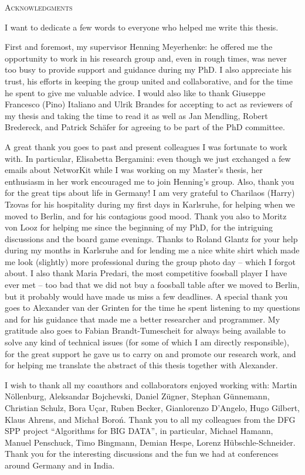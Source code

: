 \pagestyle{plain}
\begin{center}
  \textsc{Acknowledgments}
\end{center}
%
\noindent
%
I want to dedicate a few words to everyone who helped me write this thesis.

First and foremost, my supervisor Henning Meyerhenke: he offered me the
opportunity to work in his research group and, even in rough times, was never
too busy to provide support and guidance during my PhD. I also appreciate his
trust, his efforts in keeping the group united and collaborative, and for the
time he spent to give me valuable advice.
I would also like to thank Giuseppe Francesco (Pino) Italiano and
Ulrik Brandes for accepting to act as reviewers of my thesis and taking the time
to read it as well as Jan Mendling, Robert Bredereck, and Patrick Schäfer for
agreeing to be part of the PhD committee.

A great thank you goes to past and present colleagues I was fortunate to
work with. In particular, Elisabetta Bergamini: even though we just exchanged
a few emails about NetworKit while I was working on my Master's thesis,
her enthusiasm in her work encouraged me to join Henning's group.
Also, thank you for the great tips about life in Germany!
I am very grateful to Charilaos (Harry) Tzovas for his hospitality during
my first days in Karlsruhe, for helping when we moved to Berlin, and for
his contagious good mood.
Thank you also to Moritz von Looz for helping me since the beginning of my PhD,
for the intriguing discussions and the board game evenings.
Thanks to Roland Glantz for your help during my months in Karlsruhe and for
lending me a nice white shirt which made me look (slightly) more professional
during the group photo day -- which I forgot about.
I also thank Maria Predari, the most competitive foosball player I have ever met
-- too bad that we did not buy a foosball table after we moved to Berlin, but
it probably would have made us miss a few deadlines.
A special thank you goes to Alexander van der Grinten for the time he spent listening
to my questions and for his guidance that made me a better researcher and programmer.
My gratitude also goes to Fabian Brandt-Tumescheit for always being available to
solve any kind of technical issues (for some of which I am directly responsible),
for the great support he gave us to carry on and promote our research work, and for
helping me translate the abstract of this thesis together with Alexander.

I wish to thank all my coauthors and collaborators enjoyed working with: Martin
N\"ollenburg, Aleksandar Bojchevski, Daniel Z\"ugner, Stephan G\"unnemann,
Christian Schulz, Bora Uçar, Ruben Becker, Gianlorenzo D'Angelo, Hugo Gilbert,
Klaus Ahrens, and Micha{\l} Boro{\'n}.
Thank you to all my colleagues from the DFG SPP project \enquote{Algorithms for
BIG DATA}, in particular, Michael Hamann, Manuel Penschuck, Timo Bingmann,
Demian Hespe, Lorenz Hübschle-Schneider. Thank you for the interesting
discussions and the fun we had at conferences around Germany and in India.

